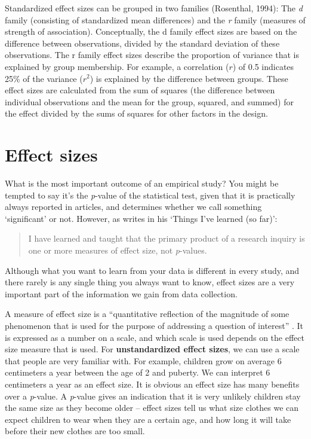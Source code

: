 \documentclass[
  oneside]{book}
\begin{document}
Standardized effect sizes can be grouped in two families (Rosenthal, 1994): The \emph{d} family (consisting of standardized mean differences) and the \emph{r} family (measures of strength of association). Conceptually, the d family effect sizes are based on the difference between observations, divided by the standard deviation of these observations. The r family effect sizes describe the proportion of variance that is explained by group membership. For example, a correlation (\(r\)) of 0.5 indicates 25\% of the variance (\(r^2\)) is explained by the difference between groups. These effect sizes are calculated from the sum of squares (the difference between individual observations and the mean for the group, squared, and summed) for the effect divided by the sums of squares for other factors in the design.

\hypertarget{effect-sizes}{%
\section{Effect sizes}\label{effect-sizes}}

What is the most important outcome of an empirical study? You might be tempted to say it's the \emph{p}-value of the statistical test, given that it is practically always reported in articles, and determines whether we call something `significant' or not. However, as \citet{cohen_things_1990} writes in his `Things I've learned (so far)':

\begin{quote}
I have learned and taught that the primary product of a research inquiry is one or more measures of effect size, not \emph{p}-values.
\end{quote}

Although what you want to learn from your data is different in every study, and there rarely is any single thing you always want to know, effect sizes are a very important part of the information we gain from data collection.

A measure of effect size is a ``quantitative reflection of the magnitude of some phenomenon that is used for the purpose of addressing a question of interest'' \citep{kelley_effect_2012}. It is expressed as a number on a scale, and which scale is used depends on the effect size measure that is used. For \textbf{unstandardized effect sizes}, we can use a scale that people are very familiar with. For example, children grow on average 6 centimeters a year between the age of 2 and puberty. We can interpret 6 centimeters a year as an effect size. It is obvious an effect size has many benefits over a \emph{p}-value. A \emph{p}-value gives an indication that it is very unlikely children stay the same size as they become older -- effect sizes tell us what size clothes we can expect children to wear when they are a certain age, and how long it will take before their new clothes are too small.
\end{document}
